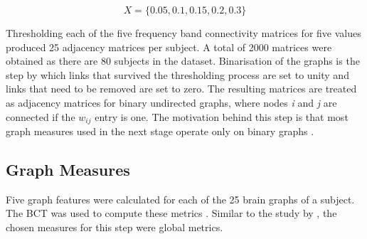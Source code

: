 		\begin{equation}\label{eq:thresholds}
			X = \{0.05, 0.1, 0.15, 0.2, 0.3\}
		\end{equation}

		Thresholding each of the five frequency band connectivity matrices for five values produced 25 adjacency matrices per subject. A total of 2000 matrices were obtained as there are 80 subjects in the dataset.  
		Binarisation of the graphs is the step by which links that survived the thresholding process are set to unity and links that need to be removed are set to zero. The resulting matrices are treated as adjacency matrices for binary undirected graphs, where nodes \textit{i} and \textit{j} are connected if the \(w_{ij}\) entry is one. The motivation behind this step is that most graph measures used in the next stage operate only on binary graphs \autocite{Rubinov2010}.  

		\subsection{Graph Measures}

		Five graph features were calculated for each of the 25 brain graphs of a subject. The \ac{BCT} was used to compute these metrics \autocite{Rubinov2010}. Similar to the study by \textcite{Rudie2012}, the chosen measures for this step were global metrics. 

